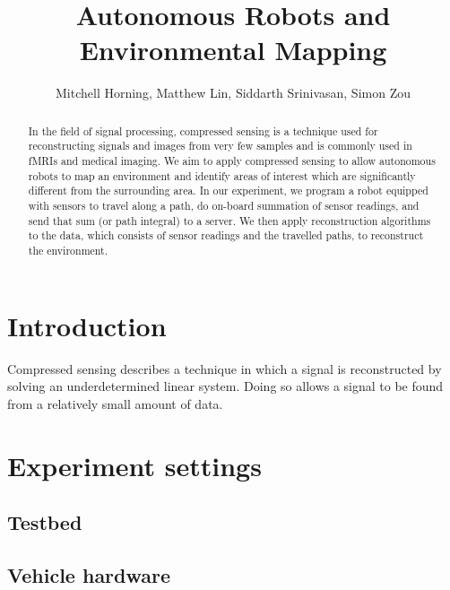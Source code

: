 \documentclass[english]{article}\usepackage[]{graphicx}\usepackage[]{color}
\begin{document}
\title{Autonomous Robots and Environmental Mapping}

\author{Mitchell Horning, Matthew Lin, Siddarth Srinivasan, Simon Zou}

\maketitle

\begin{abstract}

In the field of signal processing, compressed sensing is a technique used for 
reconstructing signals and images from very few samples and is commonly used in 
fMRIs and medical imaging. We aim to apply compressed sensing to allow 
autonomous robots to map an environment and identify areas of interest which 
are significantly different from the surrounding area. In our experiment, we 
program a robot equipped with sensors to travel along a path, do on-board 
summation of sensor readings, and send that sum (or path integral) to a 
server. We then apply reconstruction algorithms to the data, which consists of 
sensor readings and the travelled paths, to reconstruct the environment.

\end{abstract}

\tableofcontents

\section{Introduction}

\begin{comment}
Discuss Compressed Sensing

\end{comment}

Compressed sensing describes a technique in which a signal is reconstructed by 
solving an underdetermined linear system. Doing so allows a signal to be 
found from a relatively small amount of data.

\section{Experiment settings}
\subsection{Testbed}
\subsection{Vehicle hardware}
\end{document}
